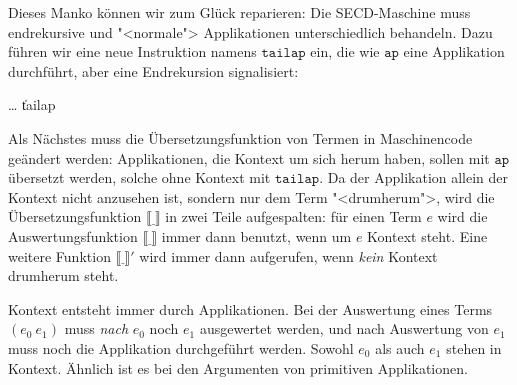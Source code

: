 %
Dieses Manko können wir zum Glück reparieren: Die
SECD-Maschine muss endrekursive und "<normale"> Applikationen
unterschiedlich behandeln.  Dazu führen wir eine neue Instruktion namens
$\mathtt{tailap}$ ein, die wie $\mathtt{ap}$ eine Applikation
durchführt, aber eine Endrekursion signalisiert:
%
\begin{grammar}
   \: \ldots
  \> \| tailap
\end{grammar}
%
Als Nächstes muss die Übersetzungsfunktion von Termen in Maschinencode
geändert werden:  Applikationen, die Kontext um sich herum haben,
sollen mit $\mathtt{ap}$ übersetzt werden, solche ohne Kontext mit
$\mathtt{tailap}$.  Da der Applikation allein der Kontext nicht
anzusehen ist, sondern nur dem Term "<drumherum">, wird die
Übersetzungsfunktion $\llbracket \underline{~} \rrbracket$ in zwei
Teile aufgespalten: für einen Term $e$ wird die Auswertungsfunktion $\llbracket\underline{~}\rrbracket$ immer dann benutzt, wenn um $e$ Kontext steht.  Eine
weitere Funktion $\llbracket \underline{~} \rrbracket'$ wird immer
dann aufgerufen, wenn \emph{kein} Kontext drumherum steht.

Kontext entsteht immer durch Applikationen.  Bei
der Auswertung eines Terms $(e_0~e_1)$ muss \emph{nach} $e_0$ noch
$e_1$ ausgewertet werden, und nach Auswertung von $e_1$ muss noch die
Applikation durchgeführt werden.  Sowohl $e_0$ als auch $e_1$ stehen
in Kontext.  Ähnlich ist es bei den Argumenten von primitiven
Applikationen.

